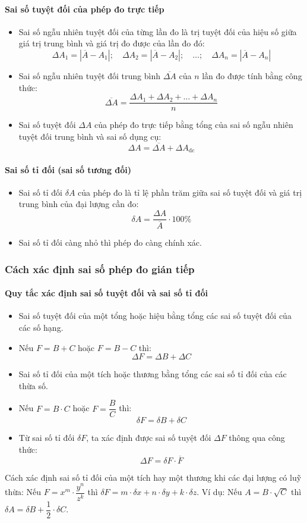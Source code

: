 \paragraph{Sai số tuyệt đối của phép đo trực tiếp}
\begin{itemize}
\item Sai số ngẫu nhiên tuyệt đối của từng lần đo là trị tuyệt đối của hiệu số giữa giá trị trung bình và giá trị đo được của lần đo đó:
\[
\Delta A_1 = |\overline{A} - A_1|; \quad \Delta A_2 = |\overline{A} - A_2|; \quad \dots; \quad \Delta A_n = |\overline{A} - A_n|
\]
\item Sai số ngẫu nhiên tuyệt đối trung bình $\overline{\Delta A}$ của $n$ lần đo được tính bằng công thức:
\[
\overline{\Delta A} = \dfrac{\Delta A_1 + \Delta A_2 + \dots + \Delta A_n}{n}
\]
\item Sai số tuyệt đối $\Delta A$ của phép đo trực tiếp bằng tổng của sai số ngẫu nhiên tuyệt đối trung bình và sai số dụng cụ:
\[
\Delta A = \overline{\Delta A} + \Delta A_{\text{dc}}
\]
\end{itemize}
\paragraph{Sai số tỉ đối (sai số tương đối)}
\begin{itemize}
\item Sai số tỉ đối $\delta A$ của phép đo là tỉ lệ phần trăm giữa sai số tuyệt đối và giá trị trung bình của đại lượng cần đo:
\[
\delta A = \dfrac{\Delta A}{\overline{A}} \cdot 100\%
\]
\item Sai số tỉ đối càng nhỏ thì phép đo càng chính xác.
\end{itemize}
\subsubsection{Cách xác định sai số phép đo gián tiếp}
\paragraph{Quy tắc xác định sai số tuyệt đối và sai số tỉ đối}
\begin{itemize}
\item Sai số tuyệt đối của một tổng hoặc hiệu bằng tổng các sai số tuyệt đối của các số hạng.
\item Nếu $F = B + C$ hoặc $F = B - C$ thì:
\[
\Delta F = \Delta B + \Delta C
\]
\item Sai số tỉ đối của một tích hoặc thương bằng tổng các sai số tỉ đối của các thừa số.
\item Nếu $F = B \cdot C$ hoặc $F = \dfrac{B}{C}$ thì:
\[
\delta F = \delta B + \delta C
\]
\item Từ sai số tỉ đối $\delta F$, ta xác định được sai số tuyệt đối $\Delta F$ thông qua công thức:
\[
\Delta F = \delta F \cdot \overline{F}
\]
\end{itemize}
\begin{emcobiet}
Cách xác định sai số tỉ đối của một tích hay một thương khi các đại lượng có luỹ thừa:
Nếu $F = x^m \cdot \dfrac{y^n}{z^k}$ thì $\delta F = m \cdot \delta x + n \cdot \delta y + k \cdot \delta z$.
Ví dụ: Nếu $A = B \cdot \sqrt{C}$ thì $\delta A = \delta B + \dfrac{1}{2} \cdot \delta C$.
\end{emcobiet}
